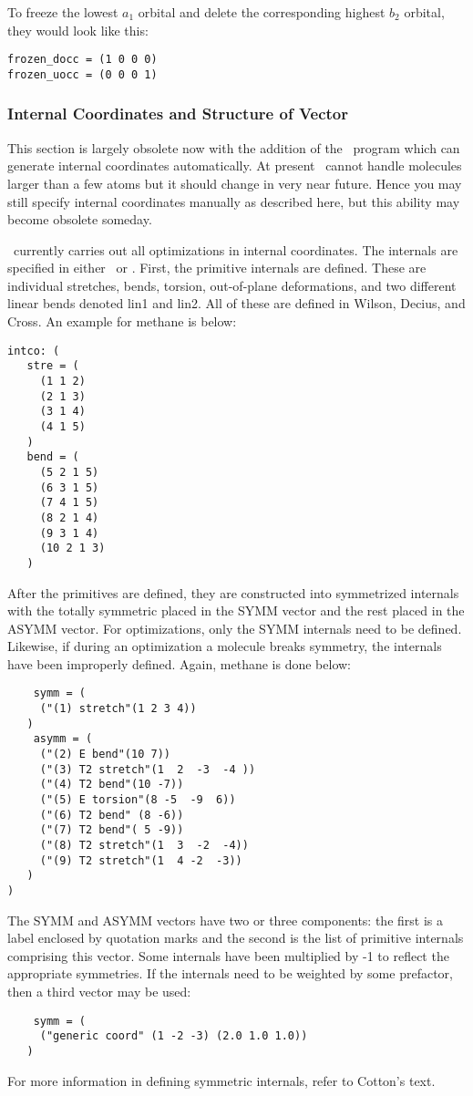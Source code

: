 To freeze the lowest $a_1$ orbital and delete the corresponding
highest $b_2$ orbital, they would look like this: 
\begin{verbatim}
frozen_docc = (1 0 0 0)
frozen_uocc = (0 0 0 1)
\end{verbatim}

\subsubsection{Internal Coordinates and Structure of  Vector}
This section is largely obsolete now with the addition of the \PSIoptking\ 
program which can generate internal coordinates automatically. At present
\PSIoptking\ cannot handle molecules larger than a few
atoms but it should change in very near future. Hence 
you may still specify internal coordinates manually
as described here, but this ability may become obsolete someday.

\PSIthree\ currently carries out all optimizations in
internal coordinates. The internals are specified in either
\ or \intcodat. First, the primitive internals
are defined. These are individual
stretches, bends, torsion, out-of-plane deformations,
and two different linear bends denoted lin1 and lin2.
All of these are defined in Wilson, Decius, and Cross. An example for methane is
below:
\begin{verbatim}
intco: (
   stre = (
     (1 1 2)
     (2 1 3)
     (3 1 4)
     (4 1 5)
   )
   bend = (
     (5 2 1 5)
     (6 3 1 5)
     (7 4 1 5)
     (8 2 1 4)
     (9 3 1 4)
     (10 2 1 3)
   )
\end{verbatim}
After the primitives are defined, they are constructed into
symmetrized internals with the totally symmetric placed in
the SYMM vector and the rest placed in the ASYMM vector. For
optimizations, only the SYMM internals need to be defined.
Likewise, if during an optimization a molecule breaks symmetry,
the internals have been improperly defined. Again, methane is done
below:
\begin{verbatim}
    symm = (
     ("(1) stretch"(1 2 3 4))
   )
    asymm = (
     ("(2) E bend"(10 7))
     ("(3) T2 stretch"(1  2  -3  -4 ))
     ("(4) T2 bend"(10 -7))
     ("(5) E torsion"(8 -5  -9  6))
     ("(6) T2 bend" (8 -6))
     ("(7) T2 bend"( 5 -9))
     ("(8) T2 stretch"(1  3  -2  -4))
     ("(9) T2 stretch"(1  4 -2  -3))
   )
)
\end{verbatim}
The SYMM and ASYMM vectors have two or three components: the first
is a label enclosed by quotation marks and the second is the list
of primitive internals comprising this vector. Some
internals have been multiplied by -1 to reflect the appropriate
symmetries. If the internals need to be weighted by some prefactor,
then a third vector may be used: 
\begin{verbatim}
    symm = (
     ("generic coord" (1 -2 -3) (2.0 1.0 1.0))
   )
\end{verbatim}
For more information in defining symmetric internals, refer to Cotton's text.

